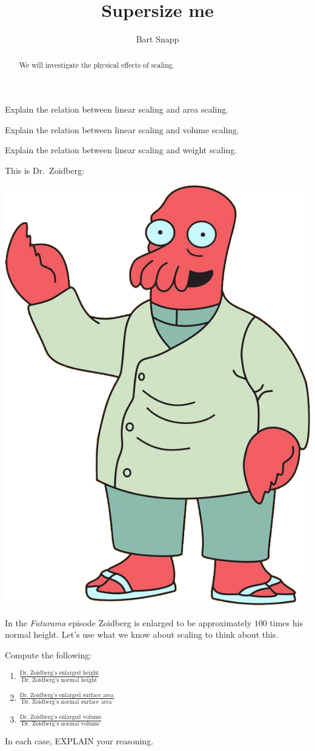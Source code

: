 \documentclass[handout,nooutcomes,noauthor]{ximera}
\title{Supersize me}
\author{Bart Snapp}
\begin{document}
\begin{abstract}
  We will investigate the physical effects of scaling.
\end{abstract}
\maketitle


\begin{listOutcomes}
\item Explain the relation between linear scaling and area scaling.
\item Explain the relation between linear scaling and volume scaling.
\item Explain the relation between linear scaling and weight scaling. 
\end{listOutcomes}

This is Dr.\ Zoidberg:

\begin{center}
  \includegraphics[width=.3\textwidth]{zoidberg.png}
\end{center}

In the \textit{Futurama} episode  Zoidberg is enlarged to be
approximately $100$ times his normal height. Let's use what we know
about scaling to think about this.

\mynewpage


 
\begin{question}
  Compute the following:
    \begin{enumerate}
    \item $\frac{\text{Dr.\ Zoidberg's enlarged
        height}}{\text{Dr.\ Zoidberg's normal height}}$
    \item $\frac{\text{Dr.\ Zoidberg's enlarged
        surface area}}{\text{Dr.\ Zoidberg's normal surface area}}$
    \item $\frac{\text{Dr.\ Zoidberg's enlarged
        volume}}{\text{Dr.\ Zoidberg's normal volume}}$
    \end{enumerate}
    In each case, EXPLAIN your reasoning.
\end{question}
\mynewpage
\end{document}

